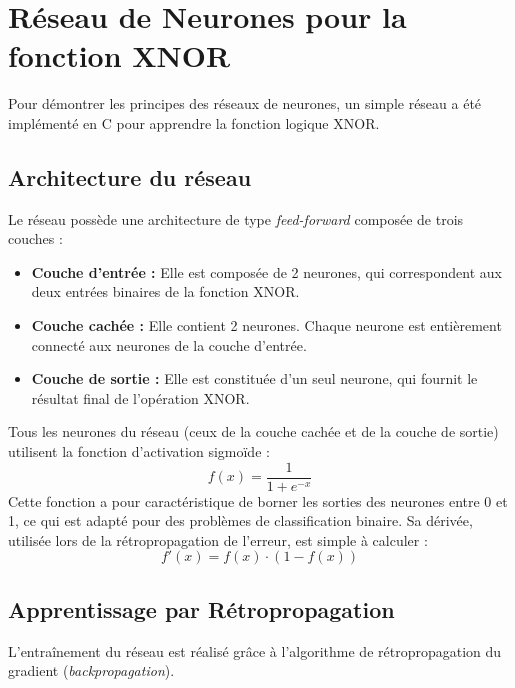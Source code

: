 \documentclass{article}
\begin{document}
\section{Réseau de Neurones pour la fonction XNOR}

Pour démontrer les principes des réseaux de neurones, un simple réseau a été implémenté en C pour apprendre la fonction logique XNOR.

\subsection{Architecture du réseau}

Le réseau possède une architecture de type \textit{feed-forward} composée de trois couches :

\begin{itemize}
    \item \textbf{Couche d'entrée :} Elle est composée de 2 neurones, qui correspondent aux deux entrées binaires de la fonction XNOR.
    \item \textbf{Couche cachée :} Elle contient 2 neurones. Chaque neurone est entièrement connecté aux neurones de la couche d'entrée.
    \item \textbf{Couche de sortie :} Elle est constituée d'un seul neurone, qui fournit le résultat final de l'opération XNOR.
\end{itemize}

Tous les neurones du réseau (ceux de la couche cachée et de la couche de sortie) utilisent la fonction d'activation sigmoïde :
\[
f(x) = \frac{1}{1 + e^{-x}}
\]
Cette fonction a pour caractéristique de borner les sorties des neurones entre 0 et 1, ce qui est adapté pour des problèmes de classification binaire. Sa dérivée, utilisée lors de la rétropropagation de l'erreur, est simple à calculer :
\[
f'(x) = f(x) \cdot (1 - f(x))
\]

\subsection{Apprentissage par Rétropropagation}

L'entraînement du réseau est réalisé grâce à l'algorithme de rétropropagation du gradient (\textit{backpropagation}).
\end{document}

